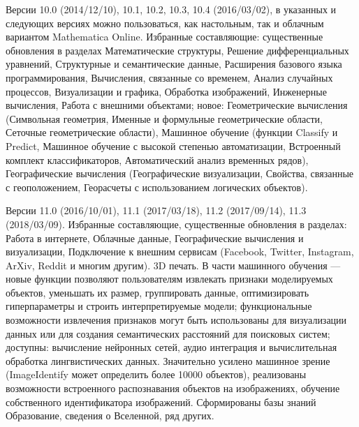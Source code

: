 \begin{textitemize}
	\item Версии 10.0 (2014/12/10), 10.1, 10.2, 10.3, 10.4 (2016/03/02), в указанных и следующих версиях можно пользоваться, как настольным, так и облачным вариантом Mathematica Online. Избранные составляющие: существенные обновления в разделах Математические структуры, Решение дифференциальных уравнений, Структурные и семантические данные, Расширения базового языка программирования, Вычисления, связанные со временем, Анализ случайных процессов, Визуализации и графика, Обработка изображений, Инженерные вычисления, Работа с внешними объектами; новое: Геометрические вычисления (Символьная геометрия, Именные и формульные геометрические области, Сеточные геометрические области), Машинное обучение (функции Classify и Predict, Машинное обучение с высокой степенью автоматизации, Встроенный комплект классификаторов, Автоматический анализ временных рядов), Географические вычисления (Географические визуализации, Свойства, связанные с геоположением, Георасчеты с использованием логических объектов).
	\item Версии 11.0 (2016/10/01), 11.1 (2017/03/18), 11.2 (2017/09/14), 11.3 (2018/03/09). Избранные составляющие, существенные обновления в разделах: Работа в интернете, Облачные данные, Географические вычисления и визуализации, Подключение к внешним сервисам (Facebook, Twitter, Instagram, ArXiv, Reddit и многим другим). 3D печать. В части машинного обучения --- новые функции позволяют пользователям извлекать признаки моделируемых объектов, уменьшать их размер, группировать данные, оптимизировать гиперпараметры и строить интерпретируемые модели; функциональные возможности извлечения признаков могут быть использованы для визуализации данных или для создания семантических расстояний для поисковых систем; доступны: вычисление нейронных сетей, аудио интеграция и вычислительная обработка лингвистических данных. Значительно усилено машинное зрение (ImageIdentify может определить более 10000 объектов), реализованы возможности встроенного распознавания объектов на изображениях, обучение собственного идентификатора изображений. Сформированы базы знаний Образование, сведения о Вселенной, ряд других. 

\end{textitemize}
